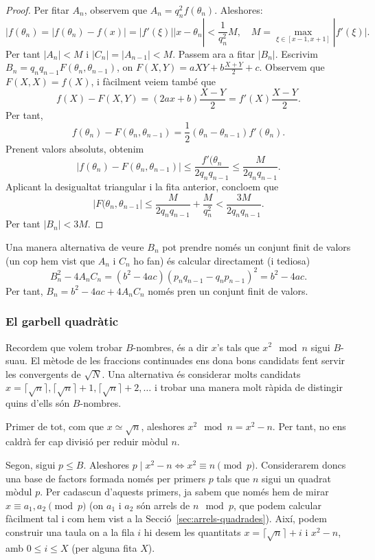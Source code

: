 \begin{proof}
Per fitar $A_n$, observem que $A_n = q_n^2 f(\theta_n)$. Aleshores:
\[
|f(\theta_n)=|f(\theta_n)-f(x)|=|f'(\xi)||x-\theta_n| < \frac{1}{q_n^2} M,\quad
M = \max_{\xi \in [x-1,x+1]} |f'(\xi)|.
\]
Per tant $|A_n|< M$ i $|C_n|=|A_{n-1}|< M$. Passem ara a fitar $|B_n|$. Escrivim $B_n =q_nq_{n-1}F(\theta_n,\theta_{n-1})$, on $F(X,Y)=aXY +b\frac{X+Y}{2} + c$.
Observem que $F(X,X)=f(X)$, i fàcilment veiem també que
\[
f(X)-F(X,Y) = (2ax+b)\frac{X-Y}{2}= f'(X)\frac{X-Y}{2}.
\]
Per tant,
\[
f(\theta_n)-F(\theta_n,\theta_{n-1}) = \frac 12 (\theta_n-\theta_{n-1}) f'(\theta_n).
\]
Prenent valors absoluts, obtenim
\[
|f(\theta_n) - F(\theta_n,\theta_{n-1})| \leq \frac{f'(\theta_n}{2q_nq_{n-1}}\leq \frac{M}{2q_nq_{n-1}}.
\]
Aplicant la desigualtat triangular i la fita anterior, concloem que
\[
|F(\theta_n,\theta_{n-1}|  \leq \frac{M}{2q_nq_{n-1}} + \frac{M}{q_n^2} < \frac{3M}{2q_nq_{n-1}}.
\]
Per tant $|B_n|< 3M$.
\end{proof}

\begin{remark}
Una manera alternativa de veure $B_n$ pot prendre només un conjunt finit de valors (un cop hem vist que $A_n$ i $C_n$ ho fan) és calcular directament (i tediosa)
\[
B_n^2 -4A_nC_n = (b^2-4ac)(p_{n}q_{n-1} - q_{n}p_{n-1})^2 = b^2-4ac.
\]
Per tant, $B_n = b^2-4ac + 4A_nC_n$ només pren un conjunt finit de valors.
\end{remark}
\subsubsection{El garbell quadràtic}
Recordem que volem trobar $B$-nombres, és a dir $x$'s tals que $x^2\mod n$ sigui $B$-suau. El mètode de les fraccions continuades ens dona bons candidats fent servir les convergents de $\sqrt{N}$. Una alternativa és considerar molts candidats $x=\lceil\sqrt{n}\rceil, \lceil\sqrt{n}\rceil + 1, \lceil\sqrt{n}\rceil+2,\ldots$ i trobar una manera molt ràpida de distingir quins d'ells són $B$-nombres.

Primer de tot, com que $x\simeq\sqrt{n}$, aleshores $x^2\mod n=x^2-n$. Per tant, no ens caldrà fer cap divisió per reduir mòdul $n$.

Segon, sigui $p\leq B$. Aleshores $p\mid x^2-n\iff x^2\equiv n\pmod{p}$. Considerarem doncs una base de factors formada només per primers $p$ tals que $n$ sigui un quadrat mòdul $p$. Per cadascun d'aquests primers, ja sabem que només hem de mirar $x\equiv a_1,a_2\pmod p$ (on $a_1$ i $a_2$ són arrels de $n\mod p$, que podem calcular fàcilment tal i com hem vist a la Secció~\ref{sec:arrels-quadrades}). Així, podem construir una taula on a la fila $i$ hi desem les quantitats $x=\lceil \sqrt{n}\rceil +i$ i $x^2-n$, amb $0\leq i\leq X$ (per alguna fita $X$).

